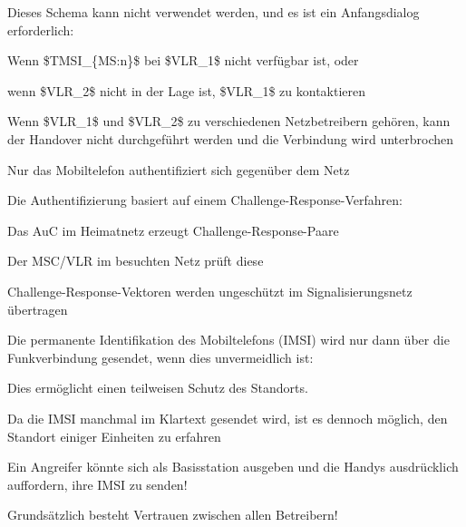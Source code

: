 \documentclass[a4paper]{article}
\begin{document}
\begin{multicols}{3}
\begin{itemize*}
\begin{itemize*}
                  \item Dieses Schema kann nicht verwendet werden, und es ist ein Anfangsdialog erforderlich:
                  \begin{itemize*}
                        \item Wenn \$TMSI\_\{MS:n\}\$ bei \$VLR\_1\$ nicht verfügbar ist, oder
                        \item wenn \$VLR\_2\$ nicht in der Lage ist, \$VLR\_1\$ zu kontaktieren
                  \end{itemize*}
                  \item Wenn \$VLR\_1\$ und \$VLR\_2\$ zu verschiedenen Netzbetreibern gehören, kann der Handover nicht durchgeführt werden und die Verbindung wird unterbrochen
            \end{itemize*}
            \item Nur das Mobiltelefon authentifiziert sich gegenüber dem Netz
            \item Die Authentifizierung basiert auf einem Challenge-Response-Verfahren:
            \begin{itemize*}
                  \item Das AuC im Heimatnetz erzeugt Challenge-Response-Paare
                  \item Der MSC/VLR im besuchten Netz prüft diese
                  \item Challenge-Response-Vektoren werden ungeschützt im Signalisierungsnetz übertragen
            \end{itemize*}
            \item Die permanente Identifikation des Mobiltelefons (IMSI) wird nur dann über die Funkverbindung gesendet, wenn dies unvermeidlich ist:
            \begin{itemize*}
                  \item Dies ermöglicht einen teilweisen Schutz des Standorts.
                  \item Da die IMSI manchmal im Klartext gesendet wird, ist es dennoch möglich, den Standort einiger Einheiten zu erfahren
                  \item Ein Angreifer könnte sich als Basisstation ausgeben und die Handys ausdrücklich auffordern, ihre IMSI zu senden!
            \end{itemize*}
            \item Grundsätzlich besteht Vertrauen zwischen allen Betreibern!
      \end{itemize*}


\end{multicols}
\end{document}
